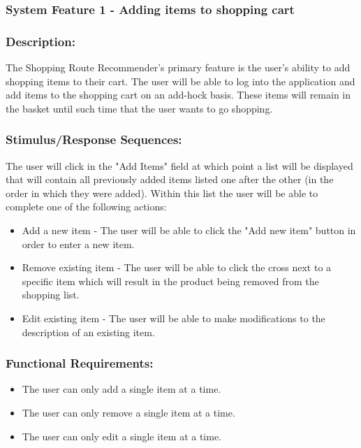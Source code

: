 \documentclass[10pt,twocolumn]{witseiepaper}
\begin{document}
		\subsubsection{System Feature 1 - Adding items to shopping cart}
		\label{featureadd}
		
		\subsubsection*{Description:}
		
		The Shopping Route Recommender's primary feature is the user's ability to add shopping items to their cart. The user will be able to log into the application and add items to the shopping cart on an add-hock basis. These items will remain in the basket until such time that the user wants to go shopping. 
		
		\subsubsection*{Stimulus/Response Sequences:}
		
		The user will click in the "Add Items" field at which point a list will be displayed that will contain all previously added items listed one after the other (in the order in which they were added). Within this list the user will be able to complete one of the following actions:
		
		\begin{itemize}
			\item Add a new item - The user will be able to click the "Add new item" button in order to enter a new item. 
			\item Remove existing item - The user will be able to click the cross next to a specific item which will result in the product being removed from the shopping list.
			\item Edit existing item - The user will be able to make modifications to the description of an existing item.
		\end{itemize}
		
		\subsubsection*{Functional Requirements:}
		
		\begin{itemize}
			\item The user can only add a single item at a time.
			\item The user can only remove a single item at a time.
			\item The user can only edit a single item at a time.
		\end{itemize}
		
\end{document}
